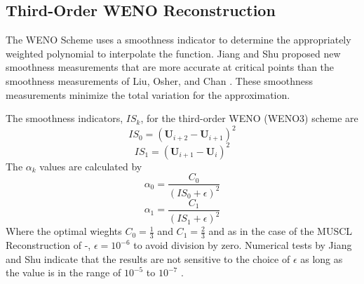 \subsection{Third-Order WENO Reconstruction}\label{sect:WENO3}

The WENO Scheme uses a smoothness indicator to determine the appropriately weighted polynomial to interpolate the function. Jiang and Shu \cite{1996JCoPh.126..202J} proposed new smoothness measurements that are more accurate at critical points than the smoothness measurements of Liu, Osher, and Chan \cite{LIU1994200}. These smoothness measurements minimize the total variation for the approximation.

The smoothness indicators, $IS_k$, for the third-order WENO (WENO3) scheme are
\begin{equation}
	IS_0 = \left(\boldsymbol{U}_{i+2} - \boldsymbol{U}_{i+1}\right)^2
\end{equation}
\begin{equation}
	IS_1 = \left(\boldsymbol{U}_{i+1} - \boldsymbol{U}_{i}\right)^2
\end{equation}
The $\alpha_k$ values are calculated by
\begin{equation}
	\alpha_0 = \frac{C_0}{\left(IS_0 + \epsilon\right)^2}
\end{equation}
\begin{equation}
	\alpha_1 = \frac{C_1}{\left(IS_1 + \epsilon\right)^2}
\end{equation}
Where the optimal wieghts $C_0 = \frac{1}{3}$ and $C_1 = \frac{2}{3}$ and as in the case of the MUSCL Reconstruction of -, $\epsilon = 10^{-6}$ to avoid division by zero. Numerical tests by Jiang and Shu indicate that the results are not sensitive to the choice of $\epsilon$ as long as the value is in the range of $10^{-5}$ to $10^{-7}$ \cite{1996JCoPh.126..202J}.

